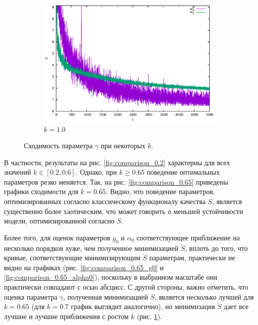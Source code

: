\documentclass[tikz,10pt,a4paper]{article}
\begin{document}
\begin{figure}[h]
\begin{subfigure}[b]{0.35\textwidth}
    \includegraphics[width=\textwidth]{figs/levmar/comparison/comparison_5000_1000_xsigma1.00_float.txt_parameter3.eps}
	\caption{$k = 1.0$}
  \end{subfigure}
  \caption{Сходимость параметра $\gamma$ при некоторых $k$.}
  \label{fig:comparison_gamma_k}
\end{figure}

В частности, результаты на рис. \ref{fig:comparison_0.2} характерны для всех
значений $k \in [0.2, 0.6]$. Однако, при $k \geq 0.65$ поведение оптимальных
параметров резко меняется. Так, на рис. \ref{fig:comparison_0.65} приведены
графики сходимости для $k = 0.65$. Видно, что поведение параметров,
оптимизированных согласно классическому функционалу качества $S$, является
существенно более хаотическим, что может говорить о меньшей устойчивости
\cite{Rudoy16StabilityAnalysis} модели, оптимизированной согласно $S$.

Более того, для оценок параметров $g_0$ и $\alpha_0$ соответствующее
приближение на несколько порядков хуже, чем полученное минимизацией $\breve{S}$,
вплоть до того, что кривые, соответствующие минимизирующим $\breve{S}$ параметрам,
практически не видно на графиках (рис. \ref{fig:comparison_0.65_g0} и
\ref{fig:comparison_0.65_alpha0}), поскольку в выбранном масштабе они
практически совпадают с осью абсцисс. С другой стороны, важно отметить, что оценка
параметра $\gamma$, полученная минимизацией $S$, является несколько лучшей для
$k = 0.65$ (для $k = 0.7$ график выглядит аналогично), но минимизация $\breve{S}$
дает все лучшие и лучшие приближения с ростом $k$ (рис.
\ref{fig:comparison_gamma_k}).
\end{document}
